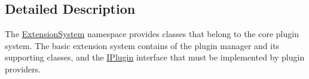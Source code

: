 \subsection{\-Detailed \-Description}
\-The \hyperlink{namespace_extension_system}{\-Extension\-System} namespace provides classes that belong to the core plugin system. \-The basic extension system contains of the plugin manager and its supporting classes, and the \hyperlink{class_extension_system_1_1_i_plugin}{\-I\-Plugin} interface that must be implemented by plugin providers. 